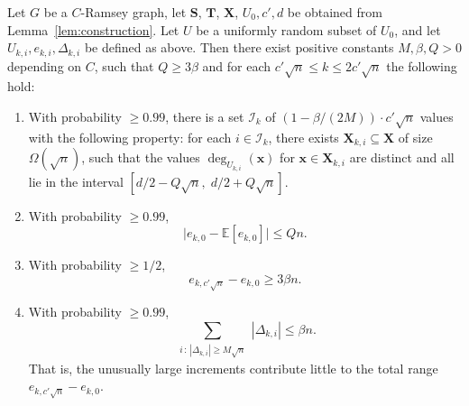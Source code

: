 \begin{lemma}
\label{lem:double-exposure}
Let $G$ be a $C$-Ramsey graph, let $\mathbf{S}$, $\mathbf{T}$, $\mathbf{X}$, $U_0, c', d$ be obtained from Lemma~\ref{lem:construction}. Let $U$ be a uniformly random subset of $U_0$, and let $U_{k, i}, e_{k, i}, \Delta_{k, i}$ be defined as above. Then there exist positive constants $M, \beta, Q > 0$ depending on $C$, such that $Q \geq 3\beta$ and for each $c'\sqrt{n} \leq k \leq 2c'\sqrt{n}$ the following hold:
\begin{enumerate}
    \item With probability $\geq 0.99$, there is a set $\mathcal{I}_k$ of $(1 - \beta/(2M)) \cdot c'\sqrt{n}$ values with the following property: for each $i \in \mathcal{I}_k$, there exists $\mathbf{X}_{k, i} \subseteq \mathbf{X}$ of size $\Omega(\sqrt{n})$, such that the values $\deg_{U_{k,i}}(\mathbf{x})$ for
        $\mathbf{x} \in \mathbf{X}_{k,i}$ are distinct and all lie in the interval $[d/2 - Q\sqrt{n},\; d/2 + Q\sqrt{n}]$.

    \item With probability $\geq 0.99$,
    \[
      \bigl|e_{k,0} - \mathbb{E}[e_{k,0}]\bigr| \leq Qn.
    \]

    \item With probability $\geq 1/2$,
    \[
      e_{k,c'\sqrt{n}} - e_{k,0} \geq 3\beta n.
    \]

    \item With probability $\geq 0.99$,
        \[
            \sum_{\substack{i \,:\, |\Delta_{k,i}| \geq M\sqrt{n}}} |\Delta_{k,i}| \leq \beta n.
        \]
        That is, the unusually large increments contribute little to the total range $e_{k,c'\sqrt{n}} - e_{k,0}$.
\end{enumerate}
\end{lemma}

